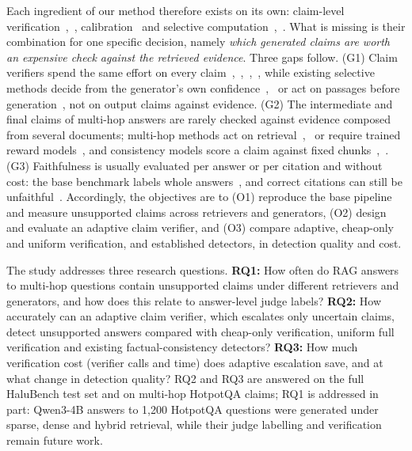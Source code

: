 \documentclass[conference]{IEEEtran}
\begin{document}
Each ingredient of our method therefore exists on its own: claim-level verification~\cite{min_factscore},~\cite{tang_minicheck}, calibration~\cite{pal_dai} and selective computation~\cite{jiang_flare},~\cite{kirubavathi_sr}. What is missing is their combination for one specific decision, namely \textit{which generated claims are worth an expensive check against the retrieved evidence}. Three gaps follow. (G1) Claim verifiers spend the same effort on every claim~\cite{min_factscore},~\cite{tang_minicheck},~\cite{pal_dai},~\cite{qian_vericite}, while existing selective methods decide from the generator's own confidence~\cite{jiang_flare},~\cite{manakul_selfcheck} or act on passages before generation~\cite{kirubavathi_sr}, not on output claims against evidence. (G2) The intermediate and final claims of multi-hop answers are rarely checked against evidence composed from several documents; multi-hop methods act on retrieval~\cite{huang_tkdd},~\cite{yuan_jksu} or require trained reward models~\cite{sun_rearter}, and consistency models score a claim against fixed chunks~\cite{zha_alignscore},~\cite{tang_minicheck}. (G3) Faithfulness is usually evaluated per answer or per citation and without cost: the base benchmark labels whole answers~\cite{mala_ml}, and correct citations can still be unfaithful~\cite{wallat_ictir}. Accordingly, the objectives are to (O1) reproduce the base pipeline and measure unsupported claims across retrievers and generators, (O2) design and evaluate an adaptive claim verifier, and (O3) compare adaptive, cheap-only and uniform verification, and established detectors, in detection quality and cost.

The study addresses three research questions. \textbf{RQ1:} How often do RAG answers to multi-hop questions contain unsupported claims under different retrievers and generators, and how does this relate to answer-level judge labels? \textbf{RQ2:} How accurately can an adaptive claim verifier, which escalates only uncertain claims, detect unsupported answers compared with cheap-only verification, uniform full verification and existing factual-consistency detectors? \textbf{RQ3:} How much verification cost (verifier calls and time) does adaptive escalation save, and at what change in detection quality? RQ2 and RQ3 are answered on the full HaluBench test set and on multi-hop HotpotQA claims; RQ1 is addressed in part: Qwen3-4B answers to 1,200 HotpotQA questions were generated under sparse, dense and hybrid retrieval, while their judge labelling and verification remain future work.
\end{document}
